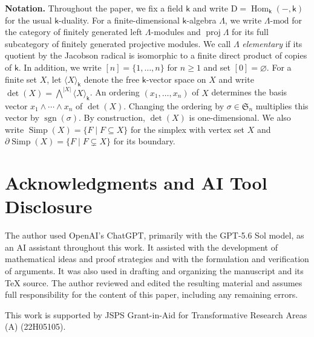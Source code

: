 \documentclass[a4paper,reqno]{amsart}
\numberwithin{equation}{section}
\theoremstyle{italicbody}
\theoremstyle{romanbody}
\newcommand{\kk}{\mathsf{k}}
\newcommand{\proj}{\operatorname{proj}}
\newcommand{\Hom}{\operatorname{Hom}}
\newcommand{\D}{\mathrm D}
\newcommand{\Simp}{\operatorname{Simp}}
\begin{document}
\medskip
\noindent\textbf{Notation.}
Throughout the paper, we fix a field $\kk$ and write
$\D=\Hom_{\kk}(-,\kk)$ for the usual $\kk$-duality.
For a finite-dimensional $\kk$-algebra $\Lambda$, we write
$\Lambda\text{-mod}$ for the category of finitely generated left
$\Lambda$-modules and $\proj\Lambda$ for its full subcategory of
finitely generated projective modules.  We call $\Lambda$
\emph{elementary} if its quotient by the Jacobson radical is isomorphic
to a finite direct product of copies of $\kk$.
In addition, we write $[n]=\{1,\ldots,n\}$ for $n\geq1$ and set
$[0]=\varnothing$.
For a finite set $X$, let $\langle X\rangle_{\kk}$ denote the free
$\kk$-vector space on $X$ and write
$\det(X)=\bigwedge^{|X|}\langle X\rangle_{\kk}$.
An ordering $(x_1,\ldots,x_n)$ of $X$ determines the basis vector
$x_1\wedge\cdots\wedge x_n$ of $\det(X)$.
Changing the ordering by $\sigma\in\mathfrak S_n$ multiplies this
vector by $\operatorname{sgn}(\sigma)$.  
By construction, $\det(X)$ is one-dimensional.
We also write
$\Simp(X)=\{F\mid F\subseteq X\}$ for the simplex with vertex set $X$
and $\partial\Simp(X)=\{F\mid F\subsetneq X\}$ for its boundary.












\section*{Acknowledgments and AI Tool Disclosure}
The author used OpenAI's ChatGPT, primarily with the GPT-5.6 Sol model,
as an AI assistant throughout this work.
It assisted with the development of mathematical ideas and proof
strategies and with the formulation and verification of arguments.
It was also used in drafting and organizing the manuscript and its
\TeX{} source.
The author reviewed and edited the resulting material and assumes full
responsibility for the content of this paper, including any remaining
errors.

This work is supported by JSPS Grant-in-Aid for Transformative Research Areas (A) (22H05105). 


 

\end{document}
